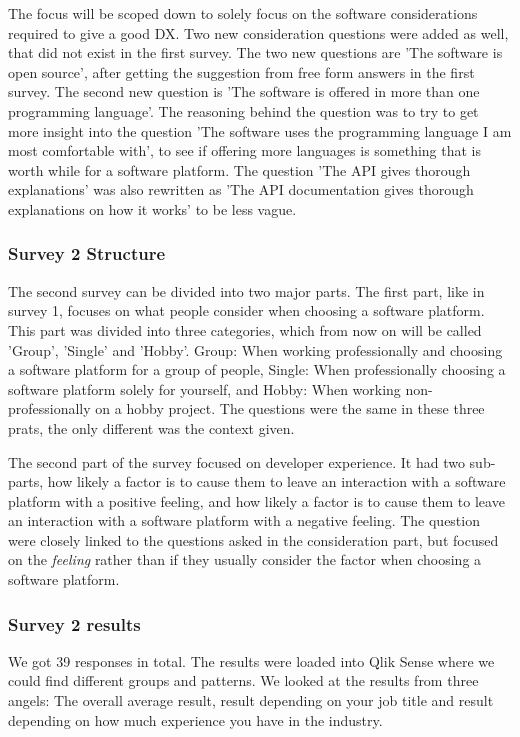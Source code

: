 \documentclass{article}
\begin{document}
The focus will be scoped down to solely focus on the software
considerations required to give a good DX. Two new consideration
questions were added as well, that did not exist in the first survey.
The two new questions are 'The software is open source', after getting
the suggestion from free form answers in the first survey. The second
new question is 'The software is offered in more than one programming
language'. The reasoning behind the question was to try to get more
insight into the question 'The software uses the programming language I
am most comfortable with', to see if offering more languages is
something that is worth while for a software platform. The question 'The
API gives thorough explanations' was also rewritten as 'The API
documentation gives thorough explanations on how it works' to be less
vague.

\subsubsection{Survey 2 Structure}

The second survey can be divided into two major parts. The first part,
like in survey 1, focuses on what people consider when choosing a
software platform. This part was divided into three categories, which
from now on will be called 'Group', 'Single' and 'Hobby'. Group: When
working professionally and choosing a software platform for a group of
people, Single: When professionally choosing a software platform solely
for yourself, and Hobby: When working non-professionally on a hobby
project. The questions were the same in these three prats, the only
different was the context given.

The second part of the survey focused on developer experience. It had
two sub-parts, how likely a factor is to cause them to leave an
interaction with a software platform with a positive feeling, and how
likely a factor is to cause them to leave an interaction with a software
platform with a negative feeling. The question were closely linked to
the questions asked in the consideration part, but focused on the
\textit{feeling} rather than if they usually consider the factor when choosing
a software platform.

\subsubsection{Survey 2 results}

We got 39 responses in total. The results were loaded into Qlik Sense
where we could find different groups and patterns. We looked at the
results from three angels: The overall average result, result depending
on your job title and result depending on how much experience you have
in the industry.
\end{document}
